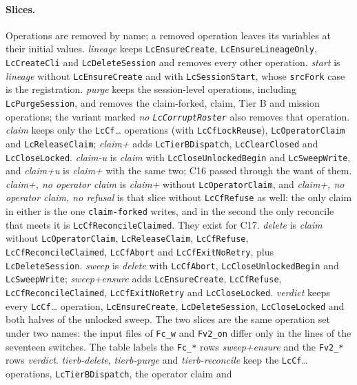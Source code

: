 \documentclass[a4paper,10pt,fleqn]{article}
\newcommand{\field}[1]{\texttt{#1}}
\begin{document}
\paragraph{Slices.} Operations are removed by name; a removed operation
leaves its variables at their initial values. \emph{lineage} keeps
\field{LcEnsureCreate}, \field{LcEnsureLineageOnly}, \field{LcCreateCli} and
\field{LcDeleteSession} and removes every other operation. \emph{start} is
\emph{lineage} without \field{LcEnsureCreate} and with
\field{LcSessionStart}, whose \field{srcFork} case is the registration.
\emph{purge} keeps the session-level operations, including
\field{LcPurgeSession}, and removes the claim-forked, claim, Tier B and
mission operations; the variant marked \emph{no \field{LcCorruptRoster}} also
removes that operation. \emph{claim} keeps only the \field{LcCf}\ldots
operations (with \field{LcCfLockReuse}), \field{LcOperatorClaim} and
\field{LcReleaseClaim}; \emph{claim+} adds \field{LcTierBDispatch},
\field{LcClearClosed} and \field{LcCloseLocked}. \emph{claim-u} is
\emph{claim} with \field{LcCloseUnlockedBegin} and \field{LcSweepWrite}, and
\emph{claim+u} is \emph{claim+} with the same two; C16 passed through the
want of them. \emph{claim+, no operator claim} is \emph{claim+} without
\field{LcOperatorClaim}, and \emph{claim+, no operator claim, no refusal} is
that slice without \field{LcCfRefuse} as well: the only claim in either is the
one \field{claim-forked} writes, and in the second the only reconcile that
meets it is \field{LcCfReconcileClaimed}. They exist for C17. \emph{delete} is \emph{claim}
without \field{LcOperatorClaim}, \field{LcReleaseClaim}, \field{LcCfRefuse},
\field{LcCfReconcileClaimed}, \field{LcCfAbort} and \field{LcCfExitNoRetry},
plus \field{LcDeleteSession}. \emph{sweep} is \emph{delete} with
\field{LcCfAbort}, \field{LcCloseUnlockedBegin} and \field{LcSweepWrite};
\emph{sweep+ensure} adds \field{LcEnsureCreate}, \field{LcCfRefuse},
\field{LcCfReconcileClaimed}, \field{LcCfExitNoRetry} and
\field{LcCloseLocked}. \emph{verdict} keeps every \field{LcCf}\ldots
operation, \field{LcEnsureCreate}, \field{LcDeleteSession},
\field{LcCloseLocked} and both halves of the unlocked sweep. The two slices
are the same operation set under two names: the input files of
\texttt{Fc\_w} and \texttt{Fv2\_on} differ only in the lines of the seventeen
switches. The table labels the \texttt{Fc\_*} rows \emph{sweep+ensure} and the
\texttt{Fv2\_*} rows \emph{verdict}.
\emph{tierb-delete}, \emph{tierb-purge} and \emph{tierb-reconcile} keep the
\field{LcCf}\ldots operations, \field{LcTierBDispatch}, the operator claim and
\end{document}
